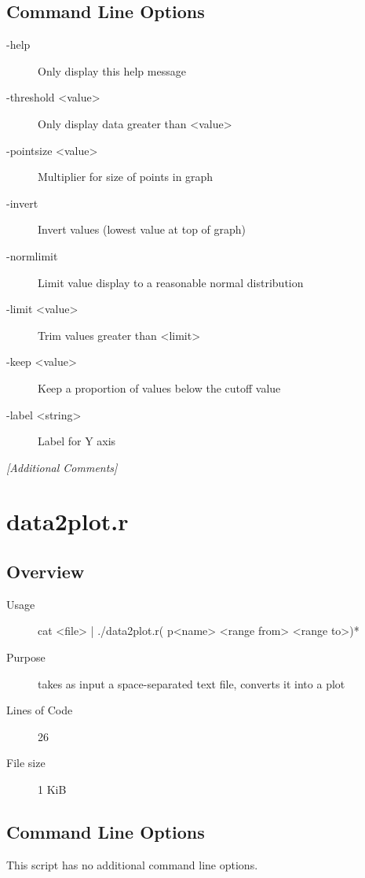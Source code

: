 \subsection{Command Line Options}
\label{sec:csplot.r-command-line}

\begin{description}
\item[-help] Only display this help message
\item[-threshold <value>] Only display data greater than <value>
\item[-pointsize <value>] Multiplier for size of points in graph
\item[-invert] Invert values (lowest value at top of graph)
\item[-normlimit] Limit value display to a reasonable normal distribution
\item[-limit <value>] Trim values greater than <limit>
\item[-keep <value>] Keep a proportion of values below the cutoff value
\item[-label <string>] Label for Y axis
\end{description}

\emph{[Additional Comments]}

\section{data2plot.r}
\label{sec:data2plot.r}

\subsection{Overview}
\label{sec:data2plot.r-overview}

\begin{description}
\item[Usage] cat <file> | ./data2plot.r( p<name> <range from> <range to>)*
\item[Purpose] takes as input a space-separated text file, converts it into a plot
\item[Lines of Code] 26
\item[File size] 1 KiB
\end{description}

\subsection{Command Line Options}
\label{sec:data2plot.r-command-line}

This script has no additional command line options.

